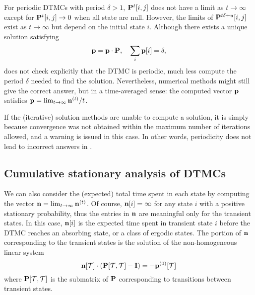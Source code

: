 For periodic DTMCs with period $\delta > 1$, $\P^t[i, j]$ does not
have a limit as $t\to\infty$ except for $\P^t[i, j]\to 0$ when all
state are null.  However, the limits of $\P^{t\delta+u}[i, j]$
exist as $t\to\infty$ but depend on the initial state $i$.
Although there exists a unique solution satisfying $$\vp = \vp
\cdot \P,\quad \sum_{i}\vp[i]=\delta,$$ {\smart} does not check
explicitly that the DTMC is periodic, much less compute the
period $\delta$ needed to find the solution. Nevertheless,
numerical methods might still give the correct answer, but in a
time-averaged sense: the computed vector $\vp$ satisfies $\vp =
\lim_{t \to\infty} \vn^{(t)}/t$.

If the (iterative) solution methods are unable to compute a
solution, it is simply because convergence was not obtained within
the maximum number of iterations allowed, and a warning is issued
in this case.  In other words, periodicity does not lead to
incorrect answers in {\smart}.


\subsection{Cumulative stationary analysis of DTMCs}\label{SEC:fundamental}
We can also consider the (expected) total time spent in each state
by computing the vector $\vn = \lim_{t \to\infty} \vn^{(t)}$. Of
course, $\vn[i] = \infty$ for any state $i$ with a positive
stationary probability,
thus the entries in $\vn$ are meaningful
only for the transient states. In this case, $\vn[i]$ is the
expected time spent in transient state $i$ before the DTMC reaches
an absorbing state, or a class of ergodic states. The portion of
$\vn$ corresponding to the transient states is the solution of the
non-homogeneous linear system
\begin{equation}
  \vn[\Set{T}] \cdot (\P[\Set{T}, \Set{T}] - \I)
  = -\vp^{(0)}[\Set{T}]
  \label{LS:absDTMC}
\end{equation}
where $\P[\Set{T}, \Set{T}]$ is the submatrix of $\P$
corresponding to transitions between transient states.

